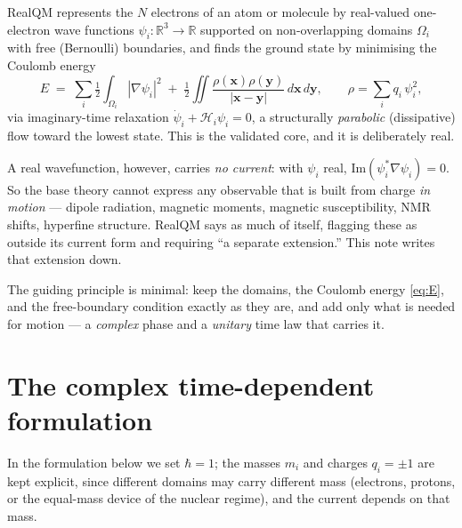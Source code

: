 \documentclass[11pt]{article}
\begin{document}
RealQM \cite{RealQM} represents the $N$ electrons of an atom or molecule by real-valued one-electron wave
functions $\psi_i:\mathbb R^3\to\mathbb R$ supported on non-overlapping domains $\Omega_i$ with free
(Bernoulli) boundaries, and finds the ground state by minimising the Coulomb energy
\begin{equation}
E \;=\; \sum_i \tfrac12\!\int_{\Omega_i}|\nabla\psi_i|^2
\;+\; \tfrac12\!\iint\frac{\rho(\mathbf x)\rho(\mathbf y)}{|\mathbf x-\mathbf y|}\,d\mathbf x\,d\mathbf y,
\qquad \rho=\sum_i q_i\,\psi_i^2 ,
\label{eq:E}
\end{equation}
via imaginary-time relaxation $\dot\psi_i + \mathcal H_i\psi_i = 0$, a structurally \emph{parabolic}
(dissipative) flow toward the lowest state. This is the validated core, and it is deliberately real.

A real wavefunction, however, carries \emph{no current}: with $\psi_i$ real,
$\mathrm{Im}(\psi_i^*\nabla\psi_i)=0$. So the base theory cannot express any observable that is built from
charge \emph{in motion} --- dipole radiation, magnetic moments, magnetic susceptibility, NMR shifts,
hyperfine structure. RealQM says as much of itself, flagging these as outside its current form and
requiring ``a separate extension.'' This note writes that extension down.

The guiding principle is minimal: keep the domains, the Coulomb energy \eqref{eq:E}, and the free-boundary
condition exactly as they are, and add only what is needed for motion --- a \emph{complex} phase and a
\emph{unitary} time law that carries it.

\section{The complex time-dependent formulation}
\label{sec:form}

In the formulation below we set $\hbar=1$; the masses $m_i$ and charges $q_i=\pm1$ are kept explicit, since different
domains may carry different mass (electrons, protons, or the equal-mass device of the nuclear regime),
and the current depends on that mass.
\end{document}
